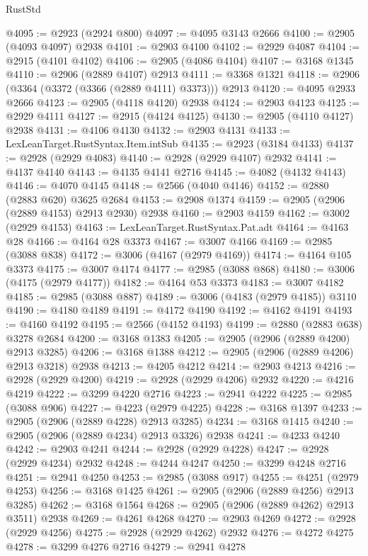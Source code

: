 \begin{lexlean}{RustStd}
\begin{coremodule}
@4095 := @2923 (@2924 @800)
@4097 := @4095 @3143 @2666
@4100 := @2905 (@4093 @4097) @2938
@4101 := @2903 @4100
@4102 := @2929 @4087
@4104 := @2915 (@4101 @4102)
@4106 := @2905 (@4086 @4104)
@4107 := @3168 @1345
@4110 := @2906 (@2889 @4107) @2913
@4111 := @3368 @1321
@4118 := @2906 (@3364 (@3372 (@3366 (@2889 @4111) @3373))) @2913
@4120 := @4095 @2933 @2666
@4123 := @2905 (@4118 @4120) @2938
@4124 := @2903 @4123
@4125 := @2929 @4111
@4127 := @2915 (@4124 @4125)
@4130 := @2905 (@4110 @4127) @2938
@4131 := @4106 @4130
@4132 := @2903 @4131
@4133 := LexLeanTarget.RustSyntax.Item.intSub
@4135 := @2923 (@3184 @4133)
@4137 := @2928 (@2929 @4083)
@4140 := @2928 (@2929 @4107) @2932
@4141 := @4137 @4140
@4143 := @4135 @4141 @2716
@4145 := @4082 (@4132 @4143)
@4146 := @4070 @4145
@4148 := @2566 (@4040 @4146)
@4152 := @2880 (@2883 @620) @3625 @2684
@4153 := @2908 @1374
@4159 := @2905 (@2906 (@2889 @4153) @2913 @2930) @2938
@4160 := @2903 @4159
@4162 := @3002 (@2929 @4153)
@4163 := LexLeanTarget.RustSyntax.Pat.adt
@4164 := @4163 @28
@4166 := @4164 @28 @3373
@4167 := @3007 @4166
@4169 := @2985 (@3088 @838)
@4172 := @3006 (@4167 (@2979 @4169))
@4174 := @4164 @105 @3373
@4175 := @3007 @4174
@4177 := @2985 (@3088 @868)
@4180 := @3006 (@4175 (@2979 @4177))
@4182 := @4164 @53 @3373
@4183 := @3007 @4182
@4185 := @2985 (@3088 @887)
@4189 := @3006 (@4183 (@2979 @4185)) @3110
@4190 := @4180 @4189
@4191 := @4172 @4190
@4192 := @4162 @4191
@4193 := @4160 @4192
@4195 := @2566 (@4152 @4193)
@4199 := @2880 (@2883 @638) @3278 @2684
@4200 := @3168 @1383
@4205 := @2905 (@2906 (@2889 @4200) @2913 @3285)
@4206 := @3168 @1388
@4212 := @2905 (@2906 (@2889 @4206) @2913 @3218) @2938
@4213 := @4205 @4212
@4214 := @2903 @4213
@4216 := @2928 (@2929 @4200)
@4219 := @2928 (@2929 @4206) @2932
@4220 := @4216 @4219
@4222 := @3299 @4220 @2716
@4223 := @2941 @4222
@4225 := @2985 (@3088 @906)
@4227 := @4223 (@2979 @4225)
@4228 := @3168 @1397
@4233 := @2905 (@2906 (@2889 @4228) @2913 @3285)
@4234 := @3168 @1415
@4240 := @2905 (@2906 (@2889 @4234) @2913 @3326) @2938
@4241 := @4233 @4240
@4242 := @2903 @4241
@4244 := @2928 (@2929 @4228)
@4247 := @2928 (@2929 @4234) @2932
@4248 := @4244 @4247
@4250 := @3299 @4248 @2716
@4251 := @2941 @4250
@4253 := @2985 (@3088 @917)
@4255 := @4251 (@2979 @4253)
@4256 := @3168 @1425
@4261 := @2905 (@2906 (@2889 @4256) @2913 @3285)
@4262 := @3168 @1564
@4268 := @2905 (@2906 (@2889 @4262) @2913 @3511) @2938
@4269 := @4261 @4268
@4270 := @2903 @4269
@4272 := @2928 (@2929 @4256)
@4275 := @2928 (@2929 @4262) @2932
@4276 := @4272 @4275
@4278 := @3299 @4276 @2716
@4279 := @2941 @4278

\end{coremodule}
\end{lexlean}
